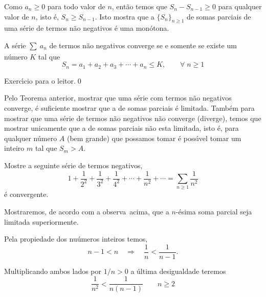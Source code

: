 Como $a_n\geq 0$ para todo valor de $n$, ent\~{a}o temos que
$S_n-S_{n-1}\geq 0$ para qualquer valor de $n$, isto \'{e}, $S_n\geq
S_{n-1}$. Isto mostra que a \seq $\{S_n\}_{n\geq 1}$ de somas
parciais de uma s\'{e}rie de termos n\~{a}o negativos \'{e} uma \seq
mon\'{o}tona.

\begin{theoc}{}{}
A s\'{e}rie $\sum_{}\, a_{n}$ de termos n\~{a}o negativos
converge se e somente se existe um n\'{u}mero $K$ tal que
\begin{equation*}
S_n=  a_1+a_2+a_3+\cdots+a_n\leq K,\qquad \forall\; n\geq 1
\end{equation*}
\end{theoc}

\begin{prvc}{}{}
Exerc\'{\i}cio para o leitor.\qed  
\end{prvc}


\begin{obs}
  Pelo Teorema anterior, mostrar que uma s\'{e}rie com
  termos n\~{a}o negativos converge, \'{e} suficiente mostrar que a \seq
  de somas parciais \'{e} limitada. Tamb\'{e}m para mostrar que uma s\'{e}rie
  de termos n\~{a}o negativos n\~{a}o converge (diverge), temos que
  mostrar unicamente que a \seq de somas parciais n\~{a}o esta
  limitada, isto \'{e}, para qualquer n\'{u}mero $A$ (bem grande) que possamos tomar  \'{e}
  poss\'{\i}vel tomar um inteiro $m$ tal que $S_m>A$.
\end{obs}

\begin{exer}
Mostre a seguinte s\'{e}rie de termos negativos,
\begin{equation*}
    1+\frac{1}{2^2}+\frac{1}{3^2}+\frac{1}{4^2}+\cdots+\frac{1}{n^2}+\cdots=\sum_{n\ge 1}\frac{1}{n^2}
\end{equation*}
\'{e} convergente.
\end{exer}

\solo Mostraremos, de acordo com a observa\cao\ acima, que a
$n$-\'{e}sima soma parcial seja limitada superiormente.

Pela propiedade dos nu\'{u}meros inteiros temos,
\begin{equation*}
    n-1<n\quad \Rightarrow\quad \frac{1}{n}<\frac{1}{n-1}.
\end{equation*}

Multiplicando ambos lados por $1/n>0$ a \'{u}ltima desigualdade teremos
\begin{equation*}
\frac{1}{n^2}<\frac{1}{n(n-1)}\qquad n\ge 2
\end{equation*}

